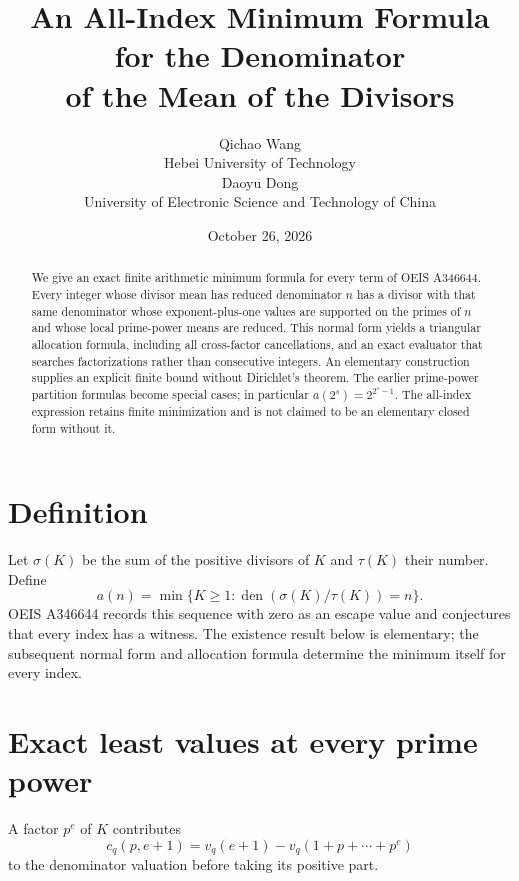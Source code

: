 \documentclass[10pt]{article}
\title{An All-Index Minimum Formula for the Denominator\\of the Mean of the Divisors}
\author{Qichao Wang\\{\small Hebei University of Technology}\\[0.3em]
Daoyu Dong\\{\small University of Electronic Science and Technology of China}}
\date{October 26, 2026}
\newcommand{\den}{\operatorname{den}}
\begin{document}
\maketitle
\begin{abstract}
We give an exact finite arithmetic minimum formula for every term of
OEIS A346644. Every integer whose divisor mean has reduced denominator
$n$ has a divisor with that same denominator whose exponent-plus-one
values are supported on the primes of $n$ and whose local prime-power
means are reduced. This normal form yields a triangular allocation
formula, including all cross-factor cancellations, and an exact evaluator
that searches factorizations rather than consecutive integers. An
elementary construction supplies an explicit finite bound without
Dirichlet's theorem. The earlier prime-power partition formulas become
special cases; in particular $a(2^s)=2^{2^s-1}$. The all-index expression
retains finite minimization and is not claimed to be an elementary
closed form without it.
\end{abstract}

\section{Definition}
Let $\sigma(K)$ be the sum of the positive divisors of $K$ and $\tau(K)$
their number. Define
\[
 a(n)=\min\{K\ge1:\den(\sigma(K)/\tau(K))=n\}.
\]
OEIS A346644 \cite{oeis} records this sequence with zero as an escape
value and conjectures that every index has a witness. The existence
result below is elementary; the subsequent normal form and allocation
formula determine the minimum itself for every index.



\section{Exact least values at every prime power}
A factor $p^e$ of $K$
contributes
\[
 c_q(p,e+1)=v_q(e+1)-v_q(1+p+\cdots+p^e)
\]
to the denominator valuation before taking its positive part.
\end{document}
